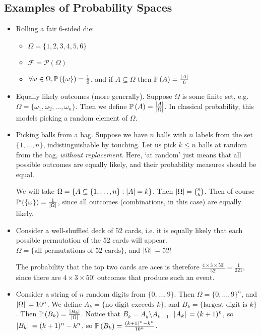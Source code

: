 \documentclass{article}
\begin{document}
\subsection{Examples of Probability Spaces}
\begin{itemize}
    \item Rolling a fair 6-sided die:
          \begin{itemize}
              \item $\Omega = \{ 1, 2, 3, 4, 5, 6 \}$
              \item $\mathcal F = \mathcal P(\Omega)$
              \item $\forall \omega \in \Omega, \mathbb{P}\left({\{ \omega \}}\right) = \frac{1}{6}$, and if $A \subseteq \Omega$ then $\mathbb{P}\left({A}\right) = \frac{\abs{A}}{6}$
          \end{itemize}

    \item Equally likely outcomes (more generally). Suppose $\Omega$ is some finite set, e.g. $\Omega = \{ \omega_1, \omega_2, \dots, \omega_n \}$. Then we define $\mathbb{P}\left({A}\right) = \frac{\abs{A}}{\abs{\Omega}}$. In classical probability, this models picking a random element of $\Omega$.

    \item Picking balls from a bag. Suppose we have $n$ balls with $n$ labels from the set $\{1, \dots, n\}$, indistinguishable by touching. Let us pick $k \leq n$ balls at random from the bag, \textit{without replacement}. Here, `at random' just means that all possible outcomes are equally likely, and their probability measures should be equal.

          We will take $\Omega = \{ A \subseteq \{1, \dots, n\} : \abs{A} = k \}$. Then $\abs{\Omega} = \binom{n}{k}$. Then of course $\mathbb{P}\left({\{ \omega \}}\right) = \frac{1}{\abs*{\Omega}}$, since all outcomes (combinations, in this case) are equally likely.

    \item Consider a well-shuffled deck of 52 cards, i.e. it is equally likely that each possible permutation of the 52 cards will appear. $\Omega = \{ \text{all permutations of 52 cards} \}$, and $\abs*{\Omega} = 52!$

          The probability that the top two cards are aces is therefore $\frac{4 \times 3 \times 50!}{52!} = \frac{1}{221}$, since there are $4 \times 3 \times 50!$ outcomes that produce such an event.

    \item Consider a string of $n$ random digits from $\{0, \dots, 9\}$. Then $\Omega = \{ 0, \dots, 9 \}^n$, and $\abs*{\Omega} = 10^n$. We define $A_k = \{ \text{no digit exceeds } k \}$, and $B_k = \{ \text{largest digit is } k \}$. Then $\mathbb{P}\left({B_k}\right) = \frac{\abs*{B_k}}{\abs*{\Omega}}$. Notice that $B_k = A_k \setminus A_{k-1}$. $\abs*{A_k} = (k+1)^n$, so $\abs*{B_k} = (k+1)^n - k^n$, so $\mathbb{P}\left({B_k}\right) = \frac{(k+1)^n - k^n}{10^n}$.


\end{itemize}
\end{document}
